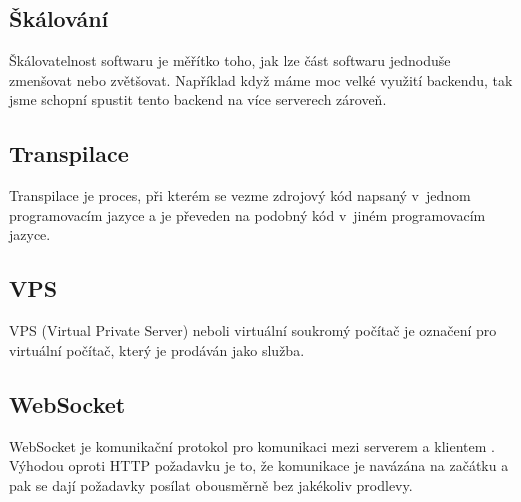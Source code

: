 \subsection{Škálování}
Škálovatelnost softwaru je měřítko toho, jak lze část softwaru jednoduše zmenšovat nebo zvětšovat. \cite{Skalovani} Například když máme moc velké využití backendu, tak jsme schopní spustit tento backend na více serverech zároveň.

\subsection{Transpilace}
Transpilace je proces, při kterém se vezme zdrojový kód napsaný v~jednom programovacím jazyce a je převeden na podobný kód v~jiném programovacím jazyce. \cite{Transpilace}

\subsection{VPS}
VPS (Virtual Private Server) neboli virtuální soukromý počítač je označení pro virtuální počítač, který je prodáván jako služba.

\subsection{WebSocket}
WebSocket je komunikační protokol pro komunikaci mezi serverem a klientem \cite{WebSocket}. Výhodou oproti HTTP požadavku je to, že komunikace je navázána na začátku a pak se dají požadavky posílat obousměrně bez jakékoliv prodlevy.
